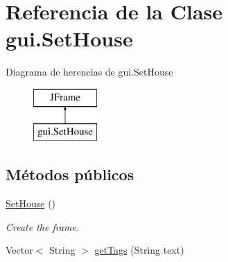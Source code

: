 \hypertarget{classgui_1_1_set_house}{}\section{Referencia de la Clase gui.\+Set\+House}
\label{classgui_1_1_set_house}
Diagrama de herencias de gui.\+Set\+House\begin{figure}[H]
\begin{center}
\leavevmode
\includegraphics[height=2.000000cm]{classgui_1_1_set_house}
\end{center}
\end{figure}
\subsection*{Métodos públicos}
\begin{DoxyCompactItemize}
\item 
\mbox{\hyperlink{classgui_1_1_set_house_aa47531b2839fe7b13dbde7fa421b03d6}{Set\+House}} ()
\begin{DoxyCompactList}\small\item\em Create the frame. \end{DoxyCompactList}\item 
Vector$<$ String $>$ \mbox{\hyperlink{classgui_1_1_set_house_ab46856159d04bd7c4f843417413107f3}{get\+Tags}} (String text)
\end{DoxyCompactItemize}
